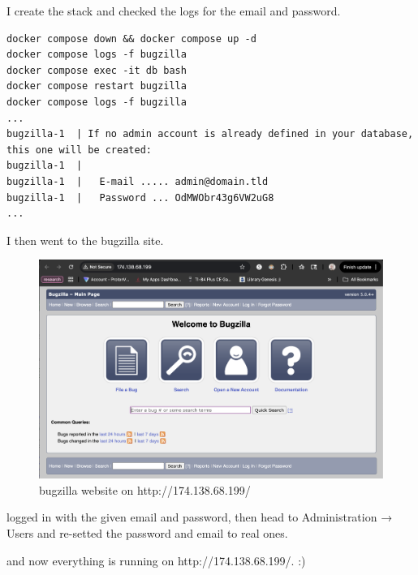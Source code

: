 I create the stack and checked the logs for the email and password. 
\begin{verbatim}
docker compose down && docker compose up -d
docker compose logs -f bugzilla
docker compose exec -it db bash
docker compose restart bugzilla
docker compose logs -f bugzilla
...
bugzilla-1  | If no admin account is already defined in your database, this one will be created:
bugzilla-1  | 
bugzilla-1  | 	E-mail ..... admin@domain.tld
bugzilla-1  | 	Password ... OdMWObr43g6VW2uG8
...
\end{verbatim} 


\noindent I then went to the bugzilla site.


\begin{figure}
    \centering
    \includegraphics[width=0.7\linewidth]{png/bugzilla_landing.png}
    \caption{bugzilla website on http://174.138.68.199/}
    \label{fig:placeholder}
\end{figure}

\noindent logged in with the given email and password, then head to Administration → Users and re-setted the password and email to real ones.

\noindent and now everything is running on http://174.138.68.199/. :)




